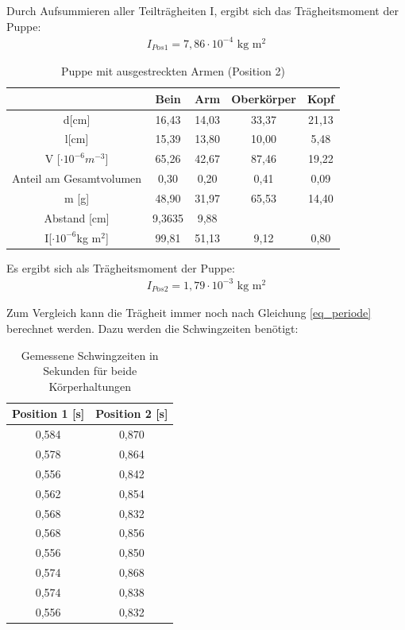 Durch Aufsummieren aller Teilträgheiten I, ergibt sich das Trägheitsmoment der Puppe:
\begin{align*}
I_{Pos 1}= 7,86
\cdot 10^{-4}\text{ kg m$^2$}
\end{align*}

\begin{table}[H]
\begin{tabular}{|c|c|c|c|c|}
\hline 		
&	Bein&	Arm	&Oberkörper	&Kopf	\\ \hline	
d[cm]&	16,43	&14,03&	33,37&	21,13		\\ \hline		
l[cm]&	15,39&	13,80&	10,00	&5,48\\ \hline
V [$\cdot 10^{-6}m^{-3}$]& 65,26&	42,67	&87,46&	19,22\\ \hline		
Anteil am Gesamtvolumen&	0,30	&0,20&	0,41&	0,09\\ \hline
m [g]&	48,90&	31,97	&65,53&	14,40\\ \hline
Abstand [cm] & 9,3635	&9,88	&&\\ \hline	
I[$\cdot 10^{-6}$kg m$^2$]&99,81	&51,13	&9,12&   0,80
\\ \hline
\end{tabular} 
\caption{Puppe mit ausgestreckten Armen (Position 2)}
\label{tab_pos2}
\end{table}

Es ergibt sich als Trägheitsmoment der Puppe:
\begin{align*}
I_{Pos 2}=1,79\cdot 10^{-3}\text{ kg m$^2$}
\end{align*}

Zum Vergleich kann die Trägheit immer noch nach Gleichung \eqref{eq_periode} berechnet werden. Dazu werden die Schwingzeiten benötigt:
\begin{table}[H]
\begin{tabular}{|c|c|}
\hline 
Position 1 [s] & Position 2 [s]\\ \hline 
0,584&	0,870\\ \hline 
0,578&	0,864\\ \hline 
0,556&	0,842\\ \hline 
0,562&	0,854\\ \hline 
0,568&	0,832\\ \hline 
0,568&	0,856\\ \hline 
0,556&	0,850\\ \hline 
0,574&	0,868\\ \hline 
0,574&	0,838\\ \hline 
0,556&	0,832\\ \hline 
\end{tabular} 
\caption{Gemessene Schwingzeiten in Sekunden für beide Körperhaltungen}
\end{table}

